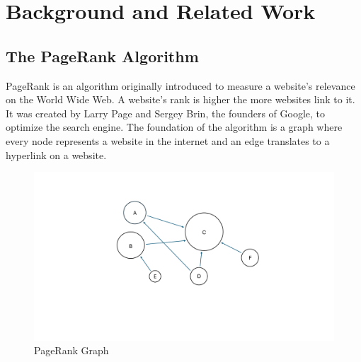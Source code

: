 
\section{Background and Related Work}
\subsection{The PageRank Algorithm}



PageRank is an algorithm originally introduced to measure a website's relevance on the World Wide Web. A website's rank is higher the more websites link to it. It was created by Larry Page and Sergey Brin, the founders of Google, to optimize the search engine.
The foundation of the algorithm is a graph where every node represents a website in the internet and an edge translates to a hyperlink on a website.
\begin{figure}[ht]
    \centering
    \includegraphics[width=0.7\linewidth]{images/PageRank Graph.pdf}
    \caption{PageRank Graph}
    \label{fig:pagerank-toy}
\end{figure}

